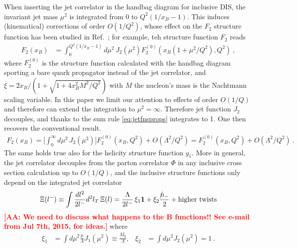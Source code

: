 \documentclass[preprintnumbers,floatfix,nofootinbib]{revtex4}
\def\AAcom#1{{\bf  \textcolor{Red}{[AA: {#1}]}}}
\newcommand{\nslash}{n \hspace{-0.24cm} / \,}
\newcommand{\mj}{M_q}
\newcommand{\mjs}{\langle m_j^2 \rangle>}
\begin{document}
When inserting the jet correlator in the handbag diagram for inclusive DIS, the invariant jet mass $\mu^2$ is integrated from 0 to $Q^2(1/x_B-1)$. This induces (kinematical) corrections of order $O(1/Q^2)$, whose effect on the $F_2$ structure function has been studied in Ref.~\cite{Accardi-Qiu}; for example, 
teh structure function $F_2$ reads
\begin{align}
  F_2(x_B) & = \int_0^{Q^2(1/x_B-1)}d\mu^2\, J_2(\mu^2) F_2^{(0)}(x_B(1+\mu^2/Q^2),Q^2) \ ,
\label{eq:F2}
\end{align}
where $F_2^{(0)}$ is the structure function calculated with the handbag diagram sporting a bare quark propagator instead of the jet correlator, and $\xi=2x_B/(1+\sqrt{1+4x_B^2M^2/Q^2})$ with $M$ the nucleon's mass is the Nachtmann scaling variable.  In this paper we limit our attention to effects of order $O(1/Q)$ and therefore can extend the integration to $\mu^2=\infty$. Therefore jet function $J_2$ decouples, and thanks to the sum rule \eqref{eq:jetfnsprops} integrates to 1. One then recovers the conventional result.
\begin{align}
  F_2(x_B) = \Big[ \int_0^\infty d\mu^2\, J_2(\mu^2) \Big] F_2^{(0)}(x_B,Q^2) 
     + O(\Lambda^2/Q^2) = F_2^{(0)}(x_B,Q^2)  + O(\Lambda^2/Q^2) \ .
\end{align}
The same holds true also for the helicity structure function $g_1$.
%
More in general, the jet correlator decouples from the parton correlator $\Phi$ in any inclusive cross section calculation up to $O(1/Q)$, and the inclusive structure functions only depend on the integrated jet correlator
\begin{equation} 
  \Xi(l^-) \equiv \int \frac{dl^2}{2l^-} d^2 l_T \, \Xi(l) 
    =  \frac{\Lambda}{2 l^-}\,\xi_1 {\bm 1}
    +  \xi_2 \frac{\nslash_-}{2} 
    + \text{higher\ twists}
\end{equation} 
\AAcom{We need to discuss what happens to the B functions!! See e-mail from Jul 7th, 2015, for ideas.}
where 
\begin{align}
\xi_1 &= \int d\mu^2 \frac{\mu}{\Lambda} J_1(\mu^2) 
       \equiv \frac{\mj}{\Lambda},
&
\xi_2 &= \int d\mu^2 J_2(\mu^2) = 1 \ .
\end{align} 
\end{document}
